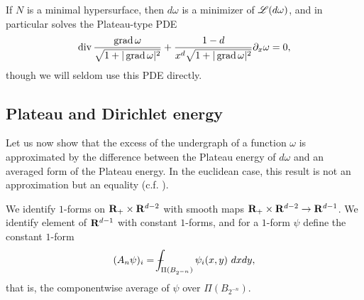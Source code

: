 If $N$ is a minimal hypersurface, then $d\omega$ is a minimizer of $\mathscr L(d\omega)$, and in particular solves the Plateau-type PDE 
\begin{equation}\label{Plateau PDE}
    \operatorname{div} \frac{\operatorname{grad} \omega}{\sqrt{1 + |\operatorname{grad} \omega|^2}} + \frac{1 - d}{x^d \sqrt{1 + |\operatorname{grad} \omega|^2}} \partial_x \omega = 0,
\end{equation}
though we will seldom use this PDE directly.


\subsection{Plateau and Dirichlet energy}
Let us now show that the excess of the undergraph of a function $\omega$ is approximated by the difference between the Plateau energy of $d\omega$ and an averaged form of the Plateau energy.
In the euclidean case, this result is not an approximation but an equality (c.f. \cite[pg83]{Giusti77}).

\begin{notation}
We identify $1$-forms on $\mathbf{R}_+ \times \mathbf{R}^{d - 2}$ with smooth maps $\mathbf{R}_+ \times \mathbf{R}^{d - 2} \to \mathbf{R}^{d - 1}$.
We identify element of $\mathbf{R}^{d - 1}$ with constant $1$-forms, and for a $1$-form $\psi$ define the constant $1$-form
$$(A_n \psi)_i = \dashint_{\Pi(B_{2^{-n}})} \psi_i(x, y) ~dxdy,$$
that is, the componentwise average of $\psi$ over $\Pi(B_{2^{-n}})$.
\end{notation}

